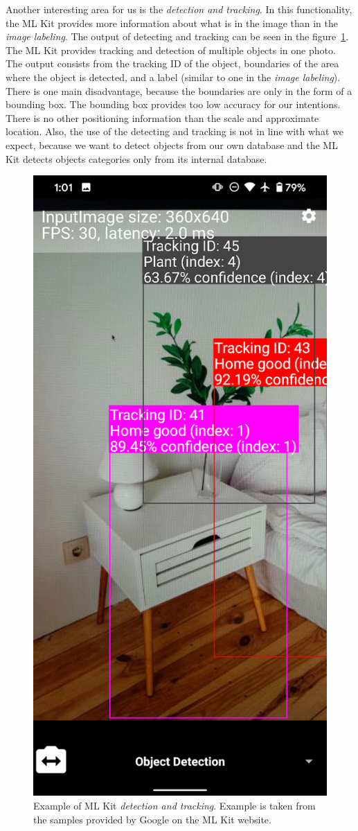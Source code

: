 \documentclass[thesis=B,english]{FITthesis}[2019/12/23]
\begin{document}
            Another interesting area for us is the \textit{detection and tracking}. In this functionality, the ML Kit provides more information about what is in the image than in the \textit{image labeling}. The output of detecting and tracking can be seen in the figure~\ref{fig:ML_Kit_object_detection_tracking}. The ML Kit provides tracking and detection of multiple objects in one photo. The output consists from the tracking ID of the object, boundaries of the area where the object is detected, and a label (similar to one in the \textit{image labeling}). There is one main disadvantage, because the boundaries are only in the form of a bounding box. The bounding box provides too low accuracy for our intentions. There is no other positioning information than the scale and approximate location. Also, the use of the detecting and tracking is not in line with what we expect, because we want to detect objects from our own database and the ML Kit  detects objects categories only from its internal database.
            
            \begin{figure}
                \centering
                \includegraphics[width = 0.4\linewidth, height = 0.8\linewidth] {pictures/ML_Kit_quickstart-object-detection.jpg}
                \caption[Example of ML Kit \textit{detection and tracking}]{Example of ML Kit \textit{detection and tracking}. Example is taken from the samples provided by Google on the ML Kit website.}
                \label{fig:ML_Kit_object_detection_tracking}
            \end{figure}
            
\end{document}
